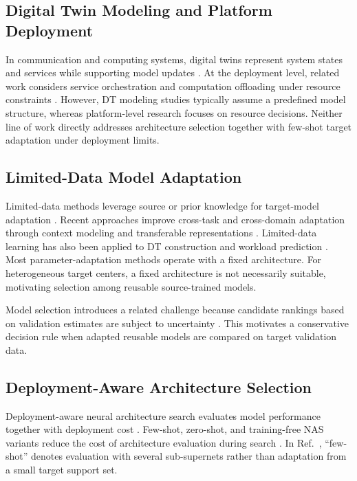 \documentclass[a4paper,fleqn]{cas-sc}
\begin{document}
\subsection{Digital Twin Modeling and Platform Deployment}

In communication and computing systems, digital twins represent system states
and services while supporting model updates \cite{ref5,ref6,ref7,ref8}.
At the deployment level, related work considers service orchestration and
computation offloading under resource constraints \cite{ref27,ref28}.
However, DT modeling studies typically assume a predefined model structure,
whereas platform-level research focuses on resource decisions. Neither line of work directly addresses architecture selection together with
few-shot target adaptation under deployment limits.

\subsection{Limited-Data Model Adaptation}

Limited-data methods leverage source or prior knowledge for target-model
adaptation \cite{ref9,ref10,ref24}. Recent approaches improve cross-task and
cross-domain adaptation through context modeling and transferable
representations \cite{ref20,ref21,ref22,ref23}. Limited-data learning has also
been applied to DT construction and workload prediction \cite{ref11,ref25}.
Most parameter-adaptation methods operate with a fixed architecture. For
heterogeneous target centers, a fixed architecture is not necessarily suitable,
motivating selection among reusable source-trained models.

Model selection introduces a related challenge because candidate rankings
based on validation estimates are subject to uncertainty
\cite{ref33,ref34}. This motivates a conservative decision rule when adapted
reusable models are compared on target validation data.

\subsection{Deployment-Aware Architecture Selection}

Deployment-aware neural architecture search evaluates model performance
together with deployment cost \cite{ref12,ref13,ref26}. Few-shot, zero-shot,
and training-free NAS variants reduce the cost of architecture evaluation
during search \cite{ref14,ref15,ref16}. In Ref.~\cite{ref14}, ``few-shot''
denotes evaluation with several sub-supernets rather than adaptation from a
small target support set.
\end{document}

